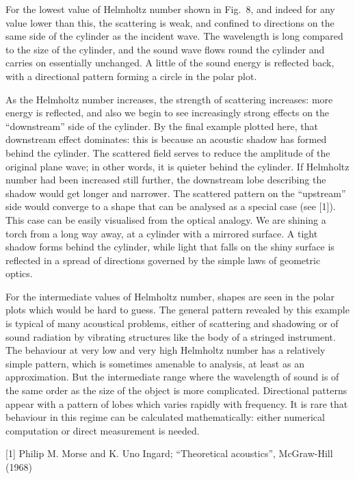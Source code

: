   For the lowest value of Helmholtz number shown in Fig.\ 8, and indeed for any 
  value lower than this, the scattering is weak, and confined to directions on 
  the same side of the cylinder as the incident wave. The wavelength is long 
  compared to the size of the cylinder, and the sound wave flows round the 
  cylinder and carries on essentially unchanged. A little of the sound energy 
  is reflected back, with a directional pattern forming a circle in the polar 
  plot. 

  As the Helmholtz number increases, the strength of scattering increases: more 
  energy is reflected, and also we begin to see increasingly strong effects on 
  the ``downstream'' side of the cylinder. By the final example plotted here, 
  that downstream effect dominates: this is because an acoustic shadow has 
  formed behind the cylinder. The scattered field serves to reduce the 
  amplitude of the original plane wave; in other words, it is quieter behind 
  the cylinder. If Helmholtz number had been increased still further, the 
  downstream lobe describing the shadow would get longer and narrower. The 
  scattered pattern on the ``upstream'' side would converge to a shape that can 
  be analysed as a special case (see [1]). This case can be easily visualised 
  from the optical analogy. We are shining a torch from a long way away, at a 
  cylinder with a mirrored surface. A tight shadow forms behind the cylinder, 
  while light that falls on the shiny surface is reflected in a spread of 
  directions governed by the simple laws of geometric optics. 

  For the intermediate values of Helmholtz number, shapes are seen in the polar 
  plots which would be hard to guess. The general pattern revealed by this 
  example is typical of many acoustical problems, either of scattering and 
  shadowing or of sound radiation by vibrating structures like the body of a 
  stringed instrument. The behaviour at very low and very high Helmholtz number 
  has a relatively simple pattern, which is sometimes amenable to analysis, at 
  least as an approximation. But the intermediate range where the wavelength of 
  sound is of the same order as the size of the object is more complicated. 
  Directional patterns appear with a pattern of lobes which varies rapidly with 
  frequency. It is rare that behaviour in this regime can be calculated 
  mathematically: either numerical computation or direct measurement is needed. 



  \sectionreferences{}[1] Philip M. Morse and K. Uno Ingard; ``Theoretical 
  acoustics'', McGraw-Hill (1968) 